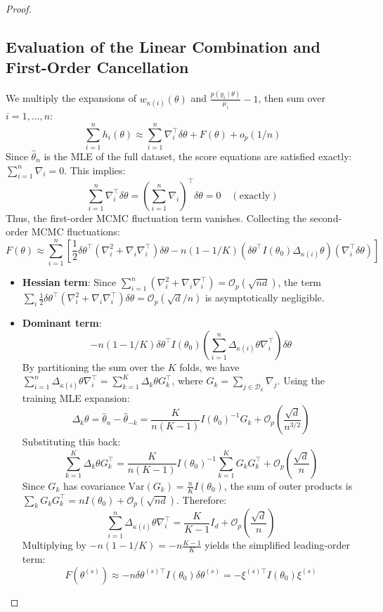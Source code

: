 \documentclass[12pt]{article}
\begin{document}
\begin{proof}
\subsection{Evaluation of the Linear Combination and First-Order Cancellation}
We multiply the expansions of $w_{\kappa(i)}(\theta)$ and $\frac{p(y_i \mid \theta)}{\mu_i} - 1$, then sum over $i = 1, \dots, n$:
\[
\sum_{i=1}^n h_i(\theta) \approx \sum_{i=1}^n \nabla_i^\top \delta\theta + F(\theta) + o_p(1/n)
\]
Since $\hat{\theta}_n$ is the MLE of the full dataset, the score equations are satisfied exactly: $\sum_{i=1}^n \nabla_i = 0$. This implies:
\[
\sum_{i=1}^n \nabla_i^\top \delta\theta = \left( \sum_{i=1}^n \nabla_i \right)^\top \delta\theta = 0 \quad (\text{exactly})
\]
Thus, the first-order MCMC fluctuation term vanishes. Collecting the second-order MCMC fluctuations:
\[
F(\theta) \approx \sum_{i=1}^n \left[ \frac{1}{2} \delta\theta^\top (\nabla^2_i + \nabla_i \nabla_i^\top) \delta\theta - n(1 - 1/K) (\delta\theta^\top I(\theta_0) \Delta_{\kappa(i)} \theta) (\nabla_i^\top \delta\theta) \right]
\]
\begin{itemize}
    \item \textbf{Hessian term}: Since $\sum_{i=1}^n (\nabla^2_i + \nabla_i \nabla_i^\top) = \mathcal{O}_p(\sqrt{nd})$, the term $\sum_i \frac{1}{2} \delta\theta^\top (\nabla^2_i + \nabla_i \nabla_i^\top) \delta\theta = \mathcal{O}_p(\sqrt{d}/n)$ is asymptotically negligible.
    \item \textbf{Dominant term}:
    \[
    -n(1 - 1/K) \delta\theta^\top I(\theta_0) \left( \sum_{i=1}^n \Delta_{\kappa(i)} \theta \nabla_i^\top \right) \delta\theta
    \]
    By partitioning the sum over the $K$ folds, we have $\sum_{i=1}^n \Delta_{\kappa(i)} \theta \nabla_i^\top = \sum_{k=1}^K \Delta_k \theta G_k^\top$, where $G_k = \sum_{j \in \mathcal{D}_k} \nabla_j$. Using the training MLE expansion:
    \[
    \Delta_k \theta = \hat{\theta}_n - \hat{\theta}_{-k} = \frac{K}{n(K-1)} I(\theta_0)^{-1} G_k + \mathcal{O}_p\left( \frac{\sqrt{d}}{n^{3/2}} \right)
    \]
    Substituting this back:
    \[
    \sum_{k=1}^K \Delta_k \theta G_k^\top = \frac{K}{n(K-1)} I(\theta_0)^{-1} \sum_{k=1}^K G_k G_k^\top + \mathcal{O}_p\left( \frac{\sqrt{d}}{n} \right)
    \]
    Since $G_k$ has covariance $\text{Var}(G_k) = \frac{n}{K} I(\theta_0)$, the sum of outer products is $\sum_k G_k G_k^\top = n I(\theta_0) + \mathcal{O}_p(\sqrt{nd})$. Therefore:
    \[
    \sum_{i=1}^n \Delta_{\kappa(i)} \theta \nabla_i^\top = \frac{K}{K-1} I_d + \mathcal{O}_p\left( \frac{\sqrt{d}}{n} \right)
    \]
    Multiplying by $-n(1 - 1/K) = -n \frac{K-1}{K}$ yields the simplified leading-order term:
    \[
    F(\theta^{(s)}) \approx -n \delta\theta^{(s)\top} I(\theta_0) \delta\theta^{(s)} = -\xi^{(s)\top} I(\theta_0) \xi^{(s)}
    \]
\end{itemize}


\end{proof}
\end{document}
